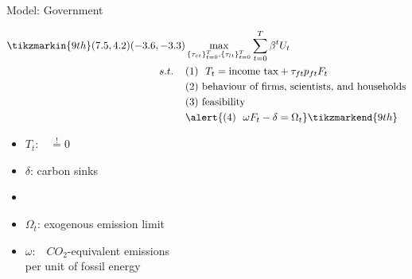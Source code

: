 \documentclass[11pt,aspectratio=169]{beamer}
\begin{document}
\addtocounter{framenumber}{-1}
\begin{frame}{Model: Government}
\begin{minipage}[t!]{1\textwidth}
	\begin{align*}
	\tikzmarkin{9th}(7.5,4.2)(-3.6,-3.3)
&\max_{\{\tau_{ct}\}_{t=0}^{T}, \{\tau_{lt}\}_{t=0}^{T}} \sum_{t=0}^{T}\beta^t U_{t}\\
s.t. \hspace{4mm}
&(1)\ \ T_t= \text{income tax}+\tau_{ft}p_{ft}F_{t}\\
& (2)\ \text{behaviour of firms, scientists, and households}\\
& (3)\ \text{feasibility} \\
&\alert{
(4)\ \  \omega F_t-\delta =\Omega_t }
	\tikzmarkend{9th}
	\end{align*}
\end{minipage}

\small
\vspace{0mm}
\begin{minipage}[t!]{0.35\textwidth}
\vspace{7mm}
\begin{itemize}
	\item[] $T_t$:\ \ $\overset{!}{=}0$  \vspace{0mm}
	\item[] $\delta$: carbon sinks\vspace{-2mm}
	\item[] 
\end{itemize}
\end{minipage}
\begin{minipage}[t!]{0.6\textwidth}
\vspace{8mm}
\begin{itemize}
	\item[] $\Omega_{t}$: exogenous emission limit
	\vspace{0mm}	
		\item[] $\omega$:\ \ $CO_2$-equivalent emissions \\ \hspace{4mm} per unit of fossil energy
\end{itemize}
\end{minipage}
\end{frame}
\end{document}
